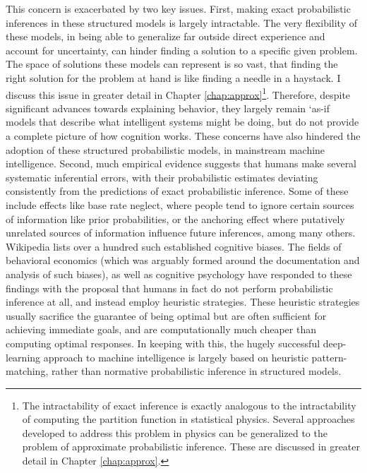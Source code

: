 This concern is exacerbated by two key issues. First, making exact probabilistic inferences in these structured models is largely intractable. The very flexibility of these models, in being able to generalize far outside direct experience and account for uncertainty, can hinder finding a solution to a specific given problem. The space of solutions these models can represent is so vast, that finding the right solution for the problem at hand is like finding a needle in a haystack. I discuss this issue in greater detail in Chapter \ref{chap:approx}\footnote{The intractability of exact inference is exactly analogous to the intractability of computing the partition function in statistical physics. Several approaches developed to address this problem in physics can be generalized to the problem of approximate probabilistic inference. These are discussed in greater detail in Chapter \ref{chap:approx}.}. Therefore, despite significant advances towards explaining behavior, they largely remain `as-if models that describe what intelligent systems might be doing, but do not provide a complete picture of how cognition works. These concerns have also hindered the adoption of these structured probabilistic models, in mainstream machine intelligence. Second, much empirical evidence suggests that humans make several systematic inferential errors, with their probabilistic estimates deviating consistently from the predictions of exact probabilistic inference. Some of these include effects like base rate neglect\citep{koehler1996base}, where people tend to ignore certain sources of information like prior probabilities, or the anchoring effect\citep{tversky} where putatively unrelated sources of information influence future inferences, among many others. Wikipedia lists over a hundred such established cognitive biases. The fields of behavioral economics\citep{kahneman1973psychology} (which was arguably formed around the documentation and analysis of such biases), as well as cognitive psychology\citep{phillips1966conservatism, gigerenzer1996reasoning} have responded to these findings with the proposal that humans in fact do not perform probabilistic inference at all, and instead employ heuristic strategies. These heuristic strategies usually sacrifice the guarantee of being optimal but are often sufficient for achieving immediate goals, and are computationally much cheaper than computing optimal responses. In keeping with this, the hugely successful deep-learning approach to machine intelligence is largely based on heuristic pattern-matching\cite{marcus2018deep, lake18}, rather than normative probabilistic inference in structured models. 

